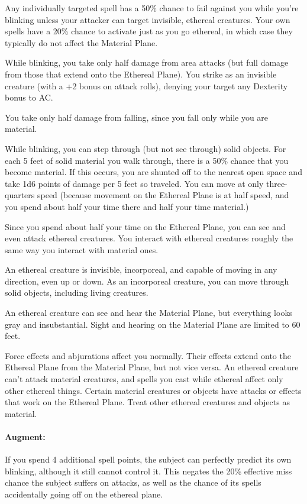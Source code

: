 Any individually targeted spell has a 50\% chance to fail against you while you're blinking unless 
your attacker can target invisible, ethereal creatures. 
Your own spells have a 20\% chance to activate just as you go ethereal, 
in which case they typically do not affect the Material Plane.

While blinking, you take only half damage from area attacks 
(but full damage from those that extend onto the Ethereal Plane). 
You strike as an invisible creature (with a +2 bonus on attack rolls), 
denying your target any Dexterity bonus to AC.

You take only half damage from falling, since you fall only while you are material.

While blinking, you can step through (but not see through) solid objects. 
For each 5 feet of solid material you walk through, 
there is a 50\% chance that you become material. 
If this occurs, you are shunted off to the nearest open space and take 1d6 points of damage per 5 feet so traveled. 
You can move at only three-quarters speed 
(because movement on the Ethereal Plane is at half speed, 
and you spend about half your time there and half your time material.)

Since you spend about half your time on the Ethereal Plane, 
you can see and even attack ethereal creatures. 
You interact with ethereal creatures roughly the same way you interact with material ones.

An ethereal creature is invisible, incorporeal, 
and capable of moving in any direction, even up or down. 
As an incorporeal creature, you can move through solid objects, including living creatures.

An ethereal creature can see and hear the Material Plane, 
but everything looks gray and insubstantial. 
Sight and hearing on the Material Plane are limited to 60 feet.

Force effects and abjurations affect you normally. 
Their effects extend onto the Ethereal Plane from the Material Plane, but not vice versa. 
An ethereal creature can't attack material creatures, 
and spells you cast while ethereal affect only other ethereal things. 
Certain material creatures or objects have attacks or effects that work on the Ethereal Plane. 
Treat other ethereal creatures and objects as material.

\paragraph{Augment:} If you spend 4 additional spell points, the subject can perfectly predict its own blinking,
although it still cannot control it. This negates the 20\% effective miss chance the subject suffers on attacks, as
well as the chance of its spells accidentally going off on the ethereal plane.
